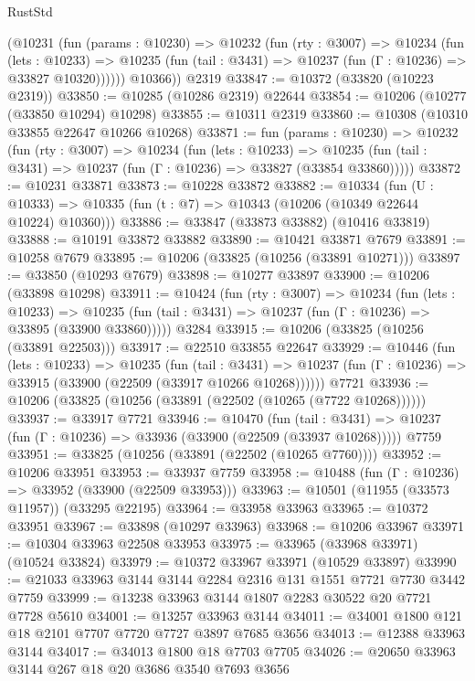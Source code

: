 \begin{lexlean}{RustStd}
\begin{coremodule}
        (@10231
          (fun (params : @10230) =>
          @10232
            (fun (rty : @3007) =>
            @10234
              (fun (lets : @10233) =>
              @10235 (fun (tail : @3431) => @10237 (fun (Γ : @10236) => @33827 @10320))))))
        @10366))
    @2319
@33847 := @10372 (@33820 (@10223 @2319))
@33850 := @10285 (@10286 @2319) @22644
@33854 := @10206 (@10277 (@33850 @10294) @10298)
@33855 := @10311 @2319
@33860 := @10308 (@10310 @33855 @22647 @10266 @10268)
@33871 := fun (params : @10230) =>
  @10232
    (fun (rty : @3007) =>
    @10234
      (fun (lets : @10233) =>
      @10235 (fun (tail : @3431) => @10237 (fun (Γ : @10236) => @33827 (@33854 @33860)))))
@33872 := @10231 @33871
@33873 := @10228 @33872
@33882 := @10334
    (fun (U : @10333) => @10335 (fun (t : @7) => @10343 (@10206 (@10349 @22644 @10224) @10360)))
@33886 := @33847 (@33873 @33882) (@10416 @33819)
@33888 := @10191 @33872 @33882
@33890 := @10421 @33871 @7679
@33891 := @10258 @7679
@33895 := @10206 (@33825 (@10256 (@33891 @10271)))
@33897 := @33850 (@10293 @7679)
@33898 := @10277 @33897
@33900 := @10206 (@33898 @10298)
@33911 := @10424
    (fun (rty : @3007) =>
    @10234
      (fun (lets : @10233) =>
      @10235 (fun (tail : @3431) => @10237 (fun (Γ : @10236) => @33895 (@33900 @33860)))))
    @3284
@33915 := @10206 (@33825 (@10256 (@33891 @22503)))
@33917 := @22510 @33855 @22647
@33929 := @10446
    (fun (lets : @10233) =>
    @10235
      (fun (tail : @3431) =>
      @10237 (fun (Γ : @10236) => @33915 (@33900 (@22509 (@33917 @10266 @10268))))))
    @7721
@33936 := @10206 (@33825 (@10256 (@33891 (@22502 (@10265 (@7722 @10268))))))
@33937 := @33917 @7721
@33946 := @10470
    (fun (tail : @3431) => @10237 (fun (Γ : @10236) => @33936 (@33900 (@22509 (@33937 @10268)))))
    @7759
@33951 := @33825 (@10256 (@33891 (@22502 (@10265 @7760))))
@33952 := @10206 @33951
@33953 := @33937 @7759
@33958 := @10488 (fun (Γ : @10236) => @33952 (@33900 (@22509 @33953)))
@33963 := @10501 (@11955 (@33573 @11957)) (@33295 @22195)
@33964 := @33958 @33963
@33965 := @10372 @33951
@33967 := @33898 (@10297 @33963)
@33968 := @10206 @33967
@33971 := @10304 @33963 @22508 @33953
@33975 := @33965 (@33968 @33971) (@10524 @33824)
@33979 := @10372 @33967 @33971 (@10529 @33897)
@33990 := @21033 @33963 @3144 @3144 @2284 @2316 @131 @1551 @7721 @7730 @3442 @7759
@33999 := @13238 @33963 @3144 @1807 @2283 @30522 @20 @7721 @7728 @5610
@34001 := @13257 @33963 @3144
@34011 := @34001 @1800 @121 @18 @2101 @7707 @7720 @7727 @3897 @7685 @3656
@34013 := @12388 @33963 @3144
@34017 := @34013 @1800 @18 @7703 @7705
@34026 := @20650 @33963 @3144 @267 @18 @20 @3686 @3540 @7693 @3656

\end{coremodule}
\end{lexlean}
